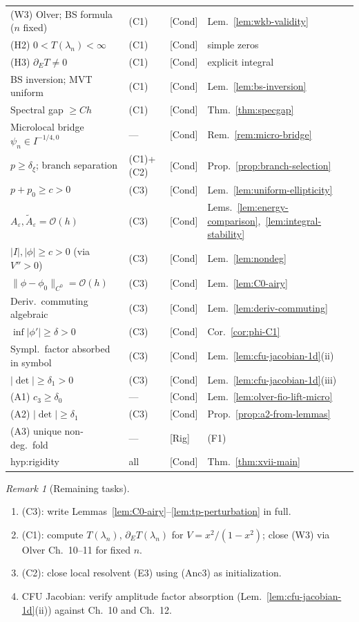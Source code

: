 \documentclass[12pt,a4paper]{amsart}
\theoremstyle{definition}
\theoremstyle{remark}
\newtheorem{remark}[theorem]{Remark}
\newcommand{\Rig}{\textup{[Rig]}}
\newcommand{\Cond}{\textup{[Cond]}}
\begin{document}
\begin{center}
\begin{tabular}{lllp{3.5cm}}
(W3) Olver; BS formula ($n$ fixed) & (C1) & \Cond & Lem.~\ref{lem:wkb-validity} \\
(H2) $0<T(\lambda_n)<\infty$ & (C1) & \Cond & simple zeros \\
(H3) $\partial_E T\ne 0$ & (C1) & \Cond & explicit integral \\
BS inversion; MVT uniform & (C1) & \Cond & Lem.~\ref{lem:bs-inversion} \\
Spectral gap $\ge Ch$ & (C1) & \Cond & Thm.~\ref{thm:specgap} \\
Microlocal bridge $\psi_n\in I^{-1/4,0}$ & --- & \Cond & Rem.~\ref{rem:micro-bridge} \\
$p\ge\delta_\xi$; branch separation & (C1)+(C2) & \Cond & Prop.~\ref{prop:branch-selection} \\
$p+p_0\ge c>0$ & (C3) & \Cond & Lem.~\ref{lem:uniform-ellipticity} \\
$A_\varepsilon,\tilde A_\varepsilon=\mathcal{O}(h)$ & (C3) & \Cond & Lems.~\ref{lem:energy-comparison},~\ref{lem:integral-stability} \\
$|I|,|\phi|\ge c>0$ (via $V''>0$) & (C3) & \Cond & Lem.~\ref{lem:nondeg} \\
$\|\phi-\phi_0\|_{C^0}=\mathcal{O}(h)$ & (C3) & \Cond & Lem.~\ref{lem:C0-airy} \\
Deriv.\ commuting algebraic & (C3) & \Cond & Lem.~\ref{lem:deriv-commuting} \\
$\inf|\phi'|\ge\delta>0$ & (C3) & \Cond & Cor.~\ref{cor:phi-C1} \\
Sympl.\ factor absorbed in symbol & (C3) & \Cond & Lem.~\ref{lem:cfu-jacobian-1d}(ii) \\
$|\det|\ge\delta_1>0$ & (C3) & \Cond & Lem.~\ref{lem:cfu-jacobian-1d}(iii) \\
(A1) $c_3\ge\delta_0$ & --- & \Cond & Lem.~\ref{lem:olver-fio-lift-micro} \\
(A2) $|\det|\ge\delta_1$ & (C3) & \Cond & Prop.~\ref{prop:a2-from-lemmas} \\
(A3) unique non-deg.\ fold & --- & \Rig & (F1) \\
\textup{hyp:rigidity} & all & \Cond & Thm.~\ref{thm:xvii-main} \\
\hline
\end{tabular}
\end{center}

\begin{remark}[Remaining tasks]
\begin{enumerate}
\item (C3): write Lemmas~\ref{lem:C0-airy}--\ref{lem:tp-perturbation} in full.
\item (C1): compute $T(\lambda_n)$, $\partial_E T(\lambda_n)$ for $V=x^2/(1-x^2)$;
  close (W3) via Olver Ch.~10--11 for fixed $n$.
\item (C2): close local resolvent (E3) using (Anc3) as initialization.
\item CFU Jacobian: verify amplitude factor absorption
  (Lem.~\ref{lem:cfu-jacobian-1d}(ii)) against
  \cite{Olver1974} Ch.~10 and \cite{Zworski2012} Ch.~12.
\end{enumerate}
\end{remark}
\end{document}
